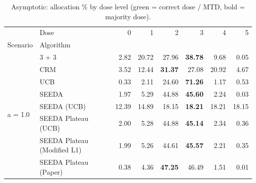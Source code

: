 \begin{table}[H]
\centering
\caption{Asymptotic: allocation \% by dose level (green = correct dose / MTD, bold = majority dose).}
\label{tab:asym_alloc_by_dose}
\begin{tabular}{llrrrrrr}
\toprule
 & Dose & 0 & 1 & 2 & 3 & 4 & 5 \\
Scenario & Algorithm &  &  &  &  &  &  \\
\midrule
\multirow[c]{8}{*}{a = 1.0} & 3 + 3 & 2.82 & 20.72 & {\cellcolor[HTML]{C8E6C9}} 27.96 & \bfseries 38.78 & 9.68 & 0.05 \\
 & CRM & 3.52 & 12.44 & {\cellcolor[HTML]{C8E6C9}} \bfseries 31.37 & 27.08 & 20.92 & 4.67 \\
 & UCB & 0.33 & 2.11 & {\cellcolor[HTML]{C8E6C9}} 24.60 & \bfseries 71.26 & 1.17 & 0.53 \\
 & SEEDA & 1.97 & 5.29 & {\cellcolor[HTML]{C8E6C9}} 44.88 & \bfseries 45.60 & 2.24 & 0.03 \\
 & SEEDA (UCB) & 12.39 & 14.89 & {\cellcolor[HTML]{C8E6C9}} 18.15 & \bfseries 18.21 & 18.21 & 18.15 \\
 & SEEDA Plateau (UCB) & 2.00 & 5.28 & {\cellcolor[HTML]{C8E6C9}} 44.88 & \bfseries 45.14 & 2.34 & 0.36 \\
 & SEEDA Plateau (Modified L1) & 1.99 & 5.26 & {\cellcolor[HTML]{C8E6C9}} 44.61 & \bfseries 45.57 & 2.21 & 0.35 \\
 & SEEDA Plateau (Paper) & 0.38 & 4.36 & {\cellcolor[HTML]{C8E6C9}} \bfseries 47.25 & 46.49 & 1.51 & 0.01 \\
\bottomrule
\end{tabular}
\end{table}
